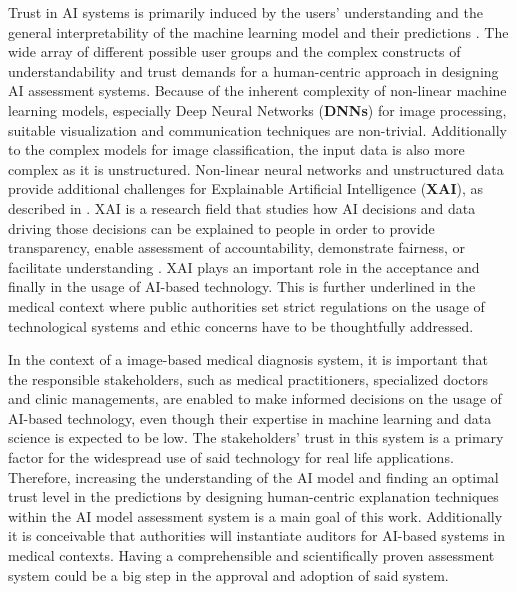 \documentclass[11pt,a4paper,english]{scrreprt}
\begin{document}
Trust in AI systems is primarily induced by the users' understanding and the general interpretability of the machine learning model and their predictions \parencite{ribeiro_why_2016, ras_explanation_2018}. The wide array of different possible user groups and the complex constructs of understandability and trust demands for a human-centric approach in designing AI assessment systems. Because of the inherent complexity of non-linear machine learning models, especially Deep Neural Networks (\textbf{DNNs}) for image processing, suitable visualization and communication techniques are non-trivial. Additionally to the complex models for image classification, the input data is also more complex as it is unstructured. Non-linear neural networks and unstructured data provide additional challenges for Explainable Artificial Intelligence (\textbf{XAI}), as described in \textcite{keane_how_2019}. XAI is a research field that studies how AI decisions and data driving those decisions can be explained to people in order to provide transparency, enable assessment of accountability, demonstrate fairness, or facilitate understanding \parencite{arrieta_explainable_2019}. XAI plays an important role in the acceptance and finally in the usage of AI-based technology. This is further underlined in the medical context where public authorities set strict regulations on the usage of technological systems and ethic concerns have to be thoughtfully addressed.

In the context of a image-based medical diagnosis system, it is important that the responsible stakeholders, such as medical practitioners, specialized doctors and clinic managements, are enabled to make informed decisions on the usage of AI-based technology, even though their expertise in machine learning and data science is expected to be low. The stakeholders' trust in this system is a primary factor for the widespread use of said technology for real life applications. Therefore, increasing the understanding of the AI model and finding an optimal trust level in the predictions by designing human-centric explanation techniques within the AI model assessment system is a main goal of this work. Additionally it is conceivable that authorities will instantiate auditors for AI-based systems in medical contexts. Having a comprehensible and scientifically proven assessment system could be a big step in the approval and adoption of said system. 
\end{document}
